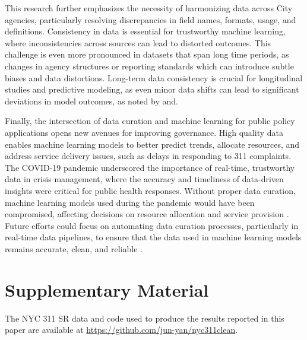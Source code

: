 \documentclass[linenumber]{jdsart}
\begin{document}
This research further emphasizes the necessity of harmonizing data
across City agencies, particularly resolving discrepancies in field
names, formats, usage, and definitions. Consistency in data is essential for
trustworthy machine learning, where inconsistencies across sources can
lead to distorted outcomes. This challenge is even more pronounced in
datasets that span long time periods, as changes in agency structures
or reporting standards which can introduce subtle biases and data 
distortions. Long-term data consistency is crucial for 
longitudinal studies and predictive modeling, as even minor 
data shifts can lead to significant deviations in model outcomes, 
as noted by \citet{rahm2000data} and\citet{borgman2012conundrum}.


Finally, the intersection of data curation and machine learning for
public policy applications opens new avenues for improving governance.
High quality data enables machine learning models to better predict
trends, allocate resources, and address service delivery issues, such
as delays in responding to 311 complaints. The COVID-19 pandemic
underscored the importance of real-time, trustworthy data in crisis
management, where the accuracy and timeliness of data-driven insights
were critical for public health responses. Without proper data
curation, machine learning models used during the pandemic would have
been compromised, affecting decisions on resource allocation and
service provision \citep{worby2020face, khemasuwan2021applications}.
Future efforts could focus on automating data curation processes,
particularly in real-time data pipelines, to ensure that the data used
in machine learning models remains accurate, clean, and reliable
\citep{chu2016data, hurbean2021open}.


\section*{Supplementary Material}
The NYC 311 SR data and code used to produce the results reported in
this paper are available at \url{https://github.com/jun-yan/nyc311clean}.




\end{document}
